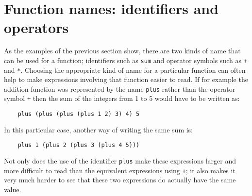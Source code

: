 \chapter{Function names: identifiers and operators}

As the examples of the previous section show, there are  two  kinds  of
name that can be used for a function; identifiers  such  as  \verb"sum"  and
operator symbols such as \verb"+" and \verb"*".
Choosing the appropriate kind of
name for a particular function  can  often  help  to  make  expressions
involving that function easier to read.  If for  example  the  addition
function was represented by the name \verb"plus" rather  than  the  operator
symbol \verb"+" then the sum of the integers from 1 to 5 would  have  to  be
written as:
\begin{verbatim}
    plus (plus (plus (plus 1 2) 3) 4) 5
\end{verbatim}
In this particular case, another way of writing the same sum is:
\begin{verbatim}
    plus 1 (plus 2 (plus 3 (plus 4 5)))
\end{verbatim}
Not only does the use of the identifier \verb"plus" make  these  expressions
larger and more difficult to read than the equivalent expressions using
\verb"+"; it  also  makes  it  very  much  harder  to  see  that  these  two
expressions do actually have the same value.

